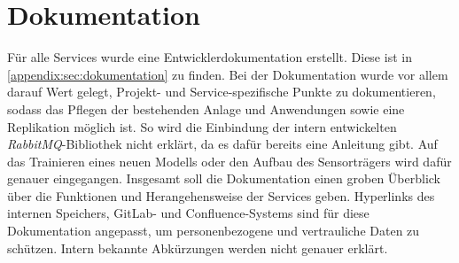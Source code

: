 \section{Dokumentation}

Für alle Services wurde eine Entwicklerdokumentation erstellt. Diese ist in \vref{appendix:sec:dokumentation} zu finden. Bei der Dokumentation wurde vor allem darauf Wert gelegt, Projekt- und Service-spezifische Punkte zu dokumentieren, sodass das Pflegen der bestehenden Anlage und Anwendungen sowie eine Replikation möglich ist. So wird die Einbindung der intern entwickelten \textit{\gls{RabbitMQ}}-Bibliothek nicht erklärt, da es dafür bereits eine Anleitung gibt. Auf das Trainieren eines neuen Modells oder den Aufbau des Sensorträgers wird dafür genauer eingegangen. Insgesamt soll die Dokumentation einen groben Überblick über die Funktionen und Herangehensweise der Services geben. Hyperlinks des internen Speichers, GitLab- und Confluence-Systems sind für diese Dokumentation angepasst, um personenbezogene und vertrauliche Daten zu schützen. Intern bekannte Abkürzungen werden nicht genauer erklärt.